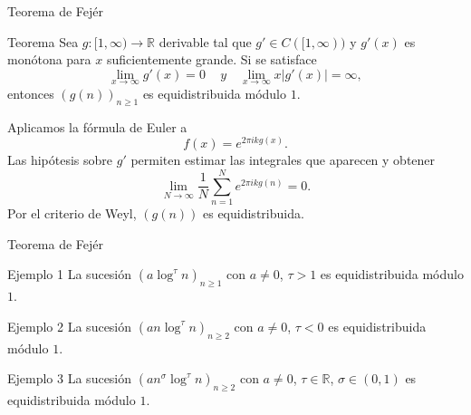 \begin{frame}{Teorema de Fejér}

\begin{block}{Teorema}
Sea $g:[1,\infty) \to \mathbb{R}$ derivable tal que $g'\in C([1,\infty))$ y 
$g'(x)$ es monótona para $x$ suficientemente grande. Si se satisface
\[
\lim_{x\to\infty} g'(x)=0\,
\quad y \quad
\lim_{x\to\infty} x|g'(x)|=\infty,
\]
entonces $(g(n))_{n\geq1}$ es equidistribuida módulo $1$.
\end{block}

\pause 

\begin{demostracion}
Aplicamos la fórmula de Euler a
\[
f(x)=e^{2\pi i k g(x)}.
\]
Las hipótesis sobre \(g'\) permiten estimar las 
integrales que aparecen y obtener
\[
\lim_{N\to\infty}
\frac1N \sum_{n=1}^{N} e^{2\pi i k g(n)}=0.
\]
Por el criterio de Weyl, \((g(n))\) es equidistribuida.
\end{demostracion}

\end{frame}

\begin{frame}{Teorema de Fejér}
    
\begin{exampleblock}{Ejemplo 1}
La sucesión $(a\log^\tau n)_{n\geq1}$ con $a\neq 0$, $\tau>1$ es equidistribuida módulo $1$.
\end{exampleblock}
\pause
\begin{exampleblock}{Ejemplo 2}
La sucesión $(an\log^\tau n)_{n\geq2}$ con $a\neq 0$, $\tau<0$ es equidistribuida módulo $1$.
\end{exampleblock}
\pause
\begin{exampleblock}{Ejemplo 3}
La sucesión $(an^\sigma\log^\tau n)_{n\geq2}$ con $a\neq 0$, $\tau\in\mathbb R$, $\sigma\in(0,1)$ es equidistribuida módulo $1$.
\end{exampleblock}

\end{frame}